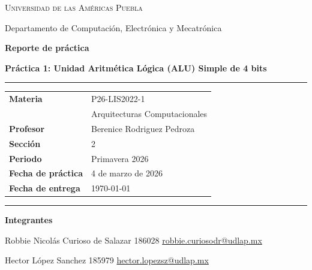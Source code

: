 \documentclass[12pt,letterpaper]{article}
\begin{document}
\begin{titlepage}
\thispagestyle{empty}
\begin{center}
\vspace*{0.8cm}

{\Large \textsc{Universidad de las Américas Puebla}}\par
{\small Departamento de Computación, Electrónica y Mecatrónica}\par

\vspace{1.2cm}

{\Huge \textbf{Reporte de práctica}}\par
\vspace{0.15cm}
{\Large \textbf{Práctica 1: Unidad Aritmética Lógica (ALU) Simple de 4 bits}}\par

\vspace{1.0cm}

\begin{minipage}{0.92\textwidth}
\rule{\textwidth}{0.8pt}\par
\vspace{0.35cm}

\begin{tabular}{@{}L{0.30\textwidth}L{0.62\textwidth}@{}}
\textbf{Materia} & P26-LIS2022-1\\
& Arquitecturas Computacionales\\
\textbf{Profesor} & Berenice Rodriguez Pedroza\\
\textbf{Sección} & 2\\
\textbf{Periodo} & Primavera 2026\\
\textbf{Fecha de práctica} & 4 de marzo de 2026\\
\textbf{Fecha de entrega} & \today\\
\end{tabular}

\vspace{0.35cm}
\rule{\textwidth}{0.8pt}
\end{minipage}

\vfill

\begin{minipage}{0.92\textwidth}
\textbf{Integrantes}\par
\vspace{0.25cm}
Robbie Nicolás Curioso de Salazar \hfill 186028 \hfill \href{mailto:robbie.curiosodr@udlap.mx}{robbie.curiosodr@udlap.mx}\par
\vspace{0.25cm}
Hector López Sanchez \hfill 185979 \hfill \href{mailto:hector.lopezsz@udlap.mx}{hector.lopezsz@udlap.mx}\par
\end{minipage}

\vspace{0.6cm}
\end{center}
\end{titlepage}
\end{document}
